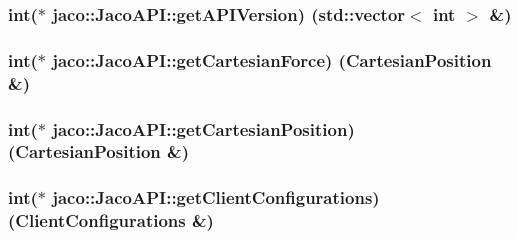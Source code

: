 \subsubsection[{\texorpdfstring{get\+A\+P\+I\+Version}{getAPIVersion}}]{\setlength{\rightskip}{0pt plus 5cm}int($\ast$ jaco\+::\+Jaco\+A\+P\+I\+::get\+A\+P\+I\+Version) (std\+::vector$<$ int $>$ \&)}\hypertarget{classjaco_1_1_jaco_a_p_i_a90f1033a1174ea7f97d48186b7ca867a}{}\label{classjaco_1_1_jaco_a_p_i_a90f1033a1174ea7f97d48186b7ca867a}
\subsubsection[{\texorpdfstring{get\+Cartesian\+Force}{getCartesianForce}}]{\setlength{\rightskip}{0pt plus 5cm}int($\ast$ jaco\+::\+Jaco\+A\+P\+I\+::get\+Cartesian\+Force) ({\bf Cartesian\+Position} \&)}\hypertarget{classjaco_1_1_jaco_a_p_i_af82e531abda1dd3e87ab33f1f5474ca5}{}\label{classjaco_1_1_jaco_a_p_i_af82e531abda1dd3e87ab33f1f5474ca5}
\subsubsection[{\texorpdfstring{get\+Cartesian\+Position}{getCartesianPosition}}]{\setlength{\rightskip}{0pt plus 5cm}int($\ast$ jaco\+::\+Jaco\+A\+P\+I\+::get\+Cartesian\+Position) ({\bf Cartesian\+Position} \&)}\hypertarget{classjaco_1_1_jaco_a_p_i_a6c3640d554617754a9ed2e875b1a2cd0}{}\label{classjaco_1_1_jaco_a_p_i_a6c3640d554617754a9ed2e875b1a2cd0}
\subsubsection[{\texorpdfstring{get\+Client\+Configurations}{getClientConfigurations}}]{\setlength{\rightskip}{0pt plus 5cm}int($\ast$ jaco\+::\+Jaco\+A\+P\+I\+::get\+Client\+Configurations) ({\bf Client\+Configurations} \&)}\hypertarget{classjaco_1_1_jaco_a_p_i_a215a64d2dee8b2555d317da41e25ae16}{}\label{classjaco_1_1_jaco_a_p_i_a215a64d2dee8b2555d317da41e25ae16}
